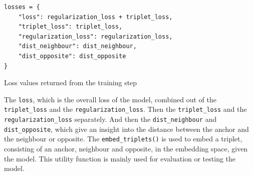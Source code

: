\begin{code}[htbp]
\begin{verbatim}
losses = {
    "loss": regularization_loss + triplet_loss,
    "triplet_loss": triplet_loss,
    "regularization_loss": regularization_loss,
    "dist_neighbour": dist_neighbour,
    "dist_opposite": dist_opposite
}
\end{verbatim}
\caption{Loss values returned from the training step}
\label{code:Loss-Values}
\end{code}
\noindent
The \texttt{loss}, which is the overall loss of the model, combined out of the \texttt{triplet\_loss} and the \texttt{regularization\_loss}. Then the \texttt{triplet\_loss} and the \texttt{regularization\_loss} separately. And then the \texttt{dist\_neighbour} and \texttt{dist\_opposite}, which give an insight into the distance between the anchor and the neighbour or opposite.
\newline
\newline
The \texttt{embed\_triplets()} is used to embed a triplet, consisting of an anchor, neighbour and opposite, in the embedding space, given the model. This utility function is mainly used for evaluation or testing the model.

